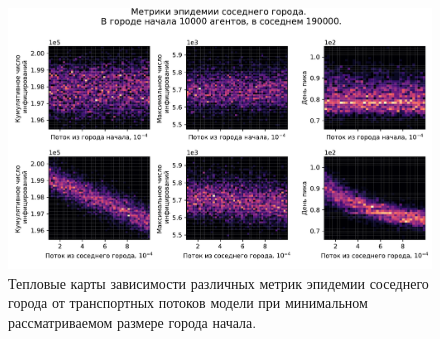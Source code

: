 \documentclass[a4paper,12pt]{article} %
\begin{document}



\begin{figure}[H]
    \centering
    \includegraphics[width=0.9\linewidth]{images/bignsmall_10000_1.pdf}
    \caption{Тепловые карты зависимости различных метрик эпидемии соседнего города от транспортных потоков модели при минимальном рассматриваемом размере города начала.}
    \label{pic:bignsmall_10000_1}
\end{figure}
\end{document}
